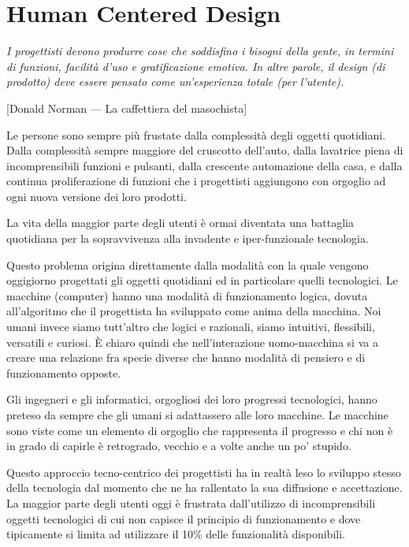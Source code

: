 \chapter{Human Centered Design}

\textit{I progettisti devono produrre cose che soddisfino i bisogni della gente, in termini di funzioni, facilità d’uso e gratificazione emotiva. In altre parole, il design (di prodotto) deve essere pensato come un’esperienza totale (per l'utente).} 

[Donald Norman — La caffettiera del masochista]

Le persone sono sempre più frustate dalla complessità degli oggetti quotidiani. Dalla complessità sempre maggiore del cruscotto dell'auto, dalla lavatrice piena di incomprensibili funzioni e pulsanti, dalla crescente automazione della casa, e dalla continua proliferazione di funzioni che i progettisti aggiungono con orgoglio ad ogni nuova versione dei loro prodotti.

La vita della maggior parte degli utenti è ormai diventata una battaglia quotidiana per la sopravvivenza alla invadente e iper-funzionale tecnologia. %

Questo problema origina direttamente dalla modalità con la quale vengono oggigiorno progettati gli oggetti quotidiani ed in particolare quelli tecnologici. Le macchine (computer) hanno una modalità di funzionamento logica, dovuta all'algoritmo che il progettista ha sviluppato come anima della macchina. Noi umani invece siamo tutt'altro che logici e razionali, siamo intuitivi, flessibili, versatili e curiosi. È chiaro quindi che nell'interazione uomo-macchina si va a creare una relazione fra specie diverse che hanno modalità di pensiero e di funzionamento opposte.

Gli ingegneri e gli informatici, orgogliosi dei loro progressi tecnologici, hanno preteso da sempre che gli umani si adattassero alle loro macchine. Le macchine sono viste come un elemento di orgoglio che rappresenta il progresso e chi non è in grado di capirle è retrogrado, vecchio e a volte anche un po' stupido.

Questo approccio tecno-centrico dei progettisti ha in realtà leso lo sviluppo stesso della tecnologia dal momento che ne ha rallentato la sua diffusione e accettazione.
La maggior parte degli utenti oggi è frustrata dall'utilizzo di incomprensibili oggetti tecnologici di cui non capisce il principio di funzionamento e dove tipicamente si limita ad utilizzare il 10\% delle funzionalità disponibili.

